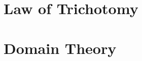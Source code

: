 \section{Law of Trichotomy}\label{sec:trichotomy_law}

\section{Domain Theory}\label{sec:domain_theory}
